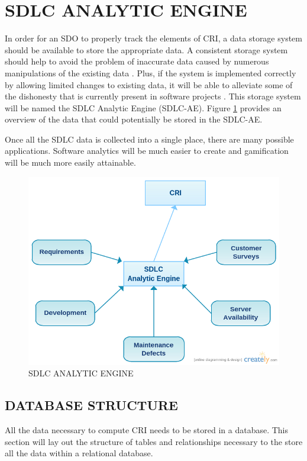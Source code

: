 \documentclass[SDSUThesis.tex]{subfiles}
\begin{document}
\section{SDLC ANALYTIC ENGINE}
\label{sec:SDLC-AE}

In order for an SDO to properly track the elements of CRI, a data storage system should be available to store the appropriate data.  A consistent storage system should help to avoid the problem of inaccurate
data caused by numerous manipulations of the existing data \cite{Olson2003}. Plus, if the system
is implemented correctly by allowing limited changes to existing data, it will be able to alleviate
some of the dishonesty that is currently present in software projects \cite{Rost2011}. This storage system will be named the SDLC Analytic Engine (SDLC-AE). Figure \ref{fig:sdlc-ae} provides an overview of the data that could potentially be stored in the SDLC-AE.


Once all the SDLC data is collected into a single place, there are many possible applications.  Software analytics
will be much easier to create and gamification will be much more easily attainable.  

\begin{figure}[ht]
\includegraphics[scale=.6]{images/sdlcae.png}
\caption{SDLC ANALYTIC ENGINE}
\label{fig:sdlc-ae}
\end{figure}

\subsection{DATABASE STRUCTURE}
   All the data necessary to compute CRI needs to be stored in a database.  This section will 
   lay out the structure of tables and relationships necessary to the store all the data
   within a relational database.  
   
\end{document}
